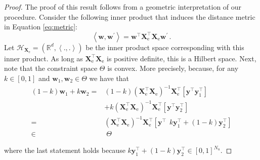 \documentclass[sts,preprint]{imsart-custom}
\newcommand{\Xe}{\vec{X}_\mathrm{e}  }
\newcommand{\XeT}{\vec{X}_\mathrm{e}^\top}
\newcommand{\G}{\left(\Xe^\top \Xe \right)^{-1}}
\renewcommand{\vec}[1]{\mathbf{#1}}
\begin{document}
\begin{proof}
The proof of this result follows from a geometric interpretation of our procedure. Consider the following inner product that induces the distance metric in Equation \eqref{eq:metric}:
\begin{equation}
\left\langle \vec{w}, \vec{w}^\prime \right\rangle = \vec{w}^\top \vec{X}_\text{e}^\top \vec{X}_\text{e} \vec{w}^\prime \,. \nonumber
\end{equation}
Let $\mathcal{H}_{\vec{X}_\text{e}} = ( \mathbb{R}^d,\left\langle ., . \right\rangle )$ be the inner product space corresponding with this inner product. As long as $\XeT \Xe$ is positive definite, this is a Hilbert space. Next, note that the constraint space $\Theta$ is convex. More precisely, because, for any $k \in [0,1]$ and $\vec{w}_\text{1},\vec{w}_\text{2} \in \Theta$ we have that
\begin{align}
(1-k) \vec{w}_\text{1} + k \vec{w}_\text{2}  = & (1-k) \G \XeT \left[\vec{y}^\top \vec{y}_\text{1}^\top \right] \nonumber \\
 & + k \G \XeT \left[\vec{y}^\top \vec{y}_\text{2}^\top \right] \nonumber \\ 
 = & \G \XeT \left[\vec{y}^\top ~~ k \vec{y}_\text{1}^\top + (1-k) \vec{y}_\text{2}^\top \right] \nonumber \\
 \in & \; \Theta \nonumber
\end{align}

where the last statement holds because $k \vec{y}_\text{1}^\top + (1-k) \vec{y}_\text{2}^\top \in [0,1]^{N_u}$.


\end{proof}
\end{document}
